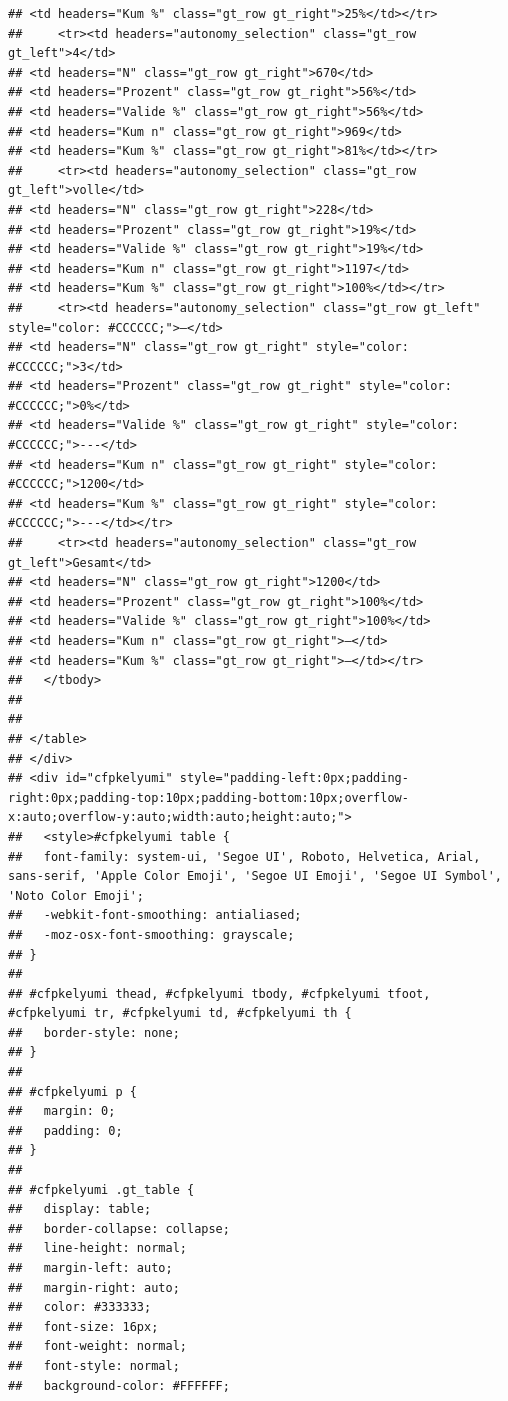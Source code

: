 \documentclass[
  a4paper,
  DIV=11,
  numbers=noendperiod]{scrartcl}
\begin{document}
\begin{verbatim}
## <td headers="Kum %" class="gt_row gt_right">25%</td></tr>
##     <tr><td headers="autonomy_selection" class="gt_row gt_left">4</td>
## <td headers="N" class="gt_row gt_right">670</td>
## <td headers="Prozent" class="gt_row gt_right">56%</td>
## <td headers="Valide %" class="gt_row gt_right">56%</td>
## <td headers="Kum n" class="gt_row gt_right">969</td>
## <td headers="Kum %" class="gt_row gt_right">81%</td></tr>
##     <tr><td headers="autonomy_selection" class="gt_row gt_left">volle</td>
## <td headers="N" class="gt_row gt_right">228</td>
## <td headers="Prozent" class="gt_row gt_right">19%</td>
## <td headers="Valide %" class="gt_row gt_right">19%</td>
## <td headers="Kum n" class="gt_row gt_right">1197</td>
## <td headers="Kum %" class="gt_row gt_right">100%</td></tr>
##     <tr><td headers="autonomy_selection" class="gt_row gt_left" style="color: #CCCCCC;">—</td>
## <td headers="N" class="gt_row gt_right" style="color: #CCCCCC;">3</td>
## <td headers="Prozent" class="gt_row gt_right" style="color: #CCCCCC;">0%</td>
## <td headers="Valide %" class="gt_row gt_right" style="color: #CCCCCC;">---</td>
## <td headers="Kum n" class="gt_row gt_right" style="color: #CCCCCC;">1200</td>
## <td headers="Kum %" class="gt_row gt_right" style="color: #CCCCCC;">---</td></tr>
##     <tr><td headers="autonomy_selection" class="gt_row gt_left">Gesamt</td>
## <td headers="N" class="gt_row gt_right">1200</td>
## <td headers="Prozent" class="gt_row gt_right">100%</td>
## <td headers="Valide %" class="gt_row gt_right">100%</td>
## <td headers="Kum n" class="gt_row gt_right">—</td>
## <td headers="Kum %" class="gt_row gt_right">—</td></tr>
##   </tbody>
##   
##   
## </table>
## </div>
## <div id="cfpkelyumi" style="padding-left:0px;padding-right:0px;padding-top:10px;padding-bottom:10px;overflow-x:auto;overflow-y:auto;width:auto;height:auto;">
##   <style>#cfpkelyumi table {
##   font-family: system-ui, 'Segoe UI', Roboto, Helvetica, Arial, sans-serif, 'Apple Color Emoji', 'Segoe UI Emoji', 'Segoe UI Symbol', 'Noto Color Emoji';
##   -webkit-font-smoothing: antialiased;
##   -moz-osx-font-smoothing: grayscale;
## }
## 
## #cfpkelyumi thead, #cfpkelyumi tbody, #cfpkelyumi tfoot, #cfpkelyumi tr, #cfpkelyumi td, #cfpkelyumi th {
##   border-style: none;
## }
## 
## #cfpkelyumi p {
##   margin: 0;
##   padding: 0;
## }
## 
## #cfpkelyumi .gt_table {
##   display: table;
##   border-collapse: collapse;
##   line-height: normal;
##   margin-left: auto;
##   margin-right: auto;
##   color: #333333;
##   font-size: 16px;
##   font-weight: normal;
##   font-style: normal;
##   background-color: #FFFFFF;

\end{verbatim}
\end{document}
